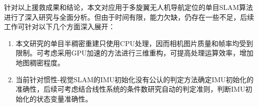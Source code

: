 \begin{conclusion}
针对以上援救成果和结论，本文对应用于多旋翼无人机导航定位的单目SLAM算法进行了深入研究与全面分析。但由于时间有限，能力欠缺，仍存在一些不足，后续工作可针对以下几个方面深入展开：
\begin{enumerate}  [label={(\arabic*)}]
\item 本文研究的单目半稠密重建只使用CPU处理，因而相机图片质量和帧率均受到限制。可考虑采用GPU加速的方法进行三维重构，可提高处理运算效率，增加地图稠密程度。
\item 当前针对惯性-视觉SLAM的IMU初始化没有公认的判定方法确定IMU初始化的准确性，后续可考虑结合线性系统的条件数研究自动的判定准则，判断IMU初始化的状态变量准确性。
\end{enumerate}





\end{conclusion}
